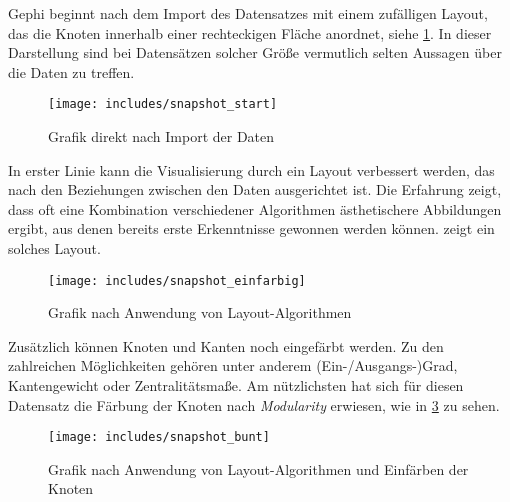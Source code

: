 \documentclass[a4paper,12pt,ngerman]{scrartcl}
\begin{document}
Gephi beginnt nach dem Import des Datensatzes mit einem zufälligen Layout, das die Knoten innerhalb einer rechteckigen Fläche anordnet, siehe \cref{fig:start}. In dieser Darstellung sind bei Datensätzen solcher Größe vermutlich selten Aussagen über die Daten zu treffen.

\begin{figure}[ht]
    \centering
    \texttt{[image: includes/snapshot\_start]}
    \caption{Grafik direkt nach Import der Daten}
    \label{fig:start}
\end{figure}

In erster Linie kann die Visualisierung durch ein Layout verbessert werden, das nach den Beziehungen zwischen den Daten ausgerichtet ist. Die Erfahrung zeigt, dass oft eine Kombination verschiedener Algorithmen ästhetischere Abbildungen ergibt, aus denen bereits erste Erkenntnisse gewonnen werden können.  zeigt ein solches Layout.

\begin{figure}[ht]
    \centering
    \texttt{[image: includes/snapshot\_einfarbig]}
    \caption{Grafik nach Anwendung von Layout-Algorithmen}
    \label{fig:einfarbig}
\end{figure}

Zusätzlich können Knoten und Kanten noch eingefärbt werden. Zu den zahlreichen Möglichkeiten gehören unter anderem (Ein-/Ausgangs-)Grad, Kantengewicht oder Zentralitätsmaße. Am nützlichsten hat sich für diesen Datensatz die Färbung der Knoten nach \emph{Modularity} erwiesen, wie in \cref{fig:bunt} zu sehen.

\begin{figure}[ht]
    \centering
    \texttt{[image: includes/snapshot\_bunt]}
    \caption{Grafik nach Anwendung von Layout-Algorithmen und Einfärben der Knoten}
    \label{fig:bunt}
\end{figure}
\end{document}
